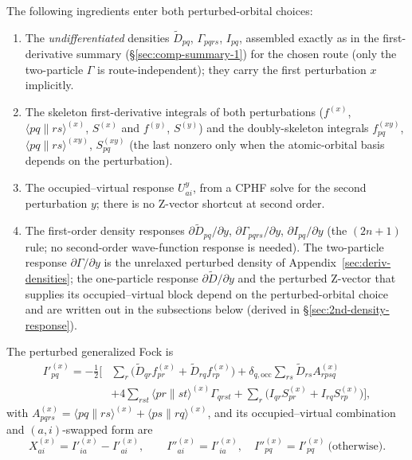 \documentclass[12pt]{article}
\newcommand{\adb}[2]{\langle #1 \| #2 \rangle}
\newcommand{\occ}{\text{occ}}
\begin{document}
The following ingredients enter both perturbed-orbital choices:
\begin{enumerate}
\item The {\em undifferentiated} densities $\tilde D_{pq}$, $\Gamma_{pqrs}$,
$I_{pq}$, assembled exactly as in the first-derivative summary
(\S\ref{sec:comp-summary-1}) for the chosen route (only the two-particle $\Gamma$
is route-independent); they carry the first perturbation $x$ implicitly.
\item The skeleton first-derivative integrals of both perturbations
($f^{(x)}$, $\adb{pq}{rs}^{(x)}$, $S^{(x)}$ and $f^{(y)}$, $S^{(y)}$) and the
doubly-skeleton integrals $f^{(xy)}_{pq}$, $\adb{pq}{rs}^{(xy)}$, $S^{(xy)}_{pq}$
(the last nonzero only when the atomic-orbital basis depends on the perturbation).
\item The occupied--virtual response $U^y_{ai}$, from a CPHF solve for the second
perturbation $y$; there is no Z-vector shortcut at second order.
\item The first-order density responses $\partial\tilde D_{pq}/\partial y$,
$\partial\Gamma_{pqrs}/\partial y$, $\partial I_{pq}/\partial y$ (the $(2n+1)$ rule;
no second-order wave-function response is needed).  The two-particle response
$\partial\Gamma/\partial y$ is the unrelaxed perturbed density of
Appendix~\ref{sec:deriv-densities}; the one-particle response
$\partial\tilde D/\partial y$ and the perturbed Z-vector that supplies its
occupied--virtual block depend on the perturbed-orbital choice and are written out
in the subsections below (derived in \S\ref{sec:2nd-density-response}).
\end{enumerate}
The perturbed generalized Fock is
\begin{align*}
I'^{(x)}_{pq} = -\tfrac12\Big[
&\sum_r\big(\tilde D_{qr}f^{(x)}_{pr}+\tilde D_{rq}f^{(x)}_{rp}\big)
+ \delta_{q,\occ}\sum_{rs}\tilde D_{rs}A^{(x)}_{rpsq}
\\
&+ 4\sum_{rst}\adb{pr}{st}^{(x)}\Gamma_{qrst}
+ \sum_r\big(I_{qr}S^{(x)}_{pr}+I_{rq}S^{(x)}_{rp}\big)\Big],
\end{align*}
with $A^{(x)}_{pqrs}=\adb{pq}{rs}^{(x)}+\adb{ps}{rq}^{(x)}$, and its
occupied--virtual combination and $(a,i)$-swapped form are
\begin{equation*}
X^{(x)}_{ai}=I'^{(x)}_{ia}-I'^{(x)}_{ai},
\qquad
I''^{(x)}_{ai}=I'^{(x)}_{ia},\quad
I''^{(x)}_{pq}=I'^{(x)}_{pq}\ \text{(otherwise)}.
\end{equation*}
\end{document}
